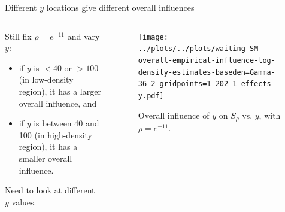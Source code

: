 \documentclass[aspectratio=169,xcolor=dvipsnames]{beamer}
\begin{document}
\begin{frame}{Different $y$ locations give different overall influences}
	
		\begin{columns}[c]
	    \begin{column}{.5\textwidth}
	    
	    	Still fix $\rho = e^{-11}$ and vary $y$: 
	    	\begin{itemize}
	    		\item if $y$ is $< 40$ or $> 100$ (in low-density region), it has a larger overall influence, and 
	    		\item if $y$ is between 40 and 100 (in high-density region), it has a smaller overall influence. 
	    	\end{itemize}
	    	
	    	\vspace{5pt}
	    		    		    	
	    	Need to look at different $y$ values. 
	    	
		\end{column}
		
	    \begin{column}{.5\textwidth}
	    \begin{figure}
	        \centering
	        \texttt{[image: ../plots/../plots/waiting-SM-overall-empirical-influence-log-density-estimates-baseden=Gamma-36-2-gridpoints=1-202-1-effects-y.pdf]}
	        \caption{Overall influence of $y$ on $S_{\rho}$ vs. $y$, with $\rho = e^{-11}$.}
	    \end{figure}
	    \end{column}
	\end{columns}
\end{frame}
\end{document}
